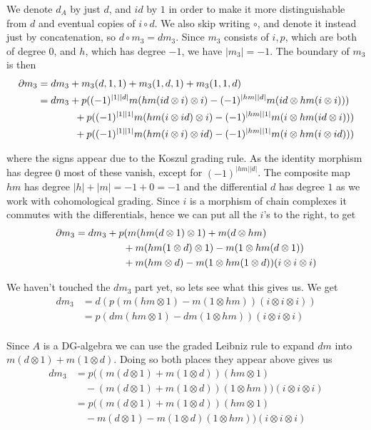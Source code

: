We denote $d_A$ by just $d$, and $id$ by $1$ in order to make it more distinguishable from $d$ and eventual copies of $i\circ d$. We also skip writing $\circ$, and denote it instead just by concatenation, so $d\circ m_3 = dm_3$. Since $m_3$ consists of $i, p$, which are both of degree $0$, and $h$, which has degree $-1$, we have $|m_3|=-1$. The boundary of $m_3$ is then
\begin{align*}
    \partial m_3 
    &= dm_3+m_3(d,1,1)+m_3(1,d,1)+m_3(1,1,d)\\
    &= dm_3
    +p((-1)^{|1||d|}m(hm(id\otimes i)\otimes i)
    -(-1)^{|hm||d|}m(id\otimes hm(i\otimes i))) \\
    & \hspace{13mm} 
    +p((-1)^{|1||1|}m(hm(i\otimes id)\otimes i)
    -(-1)^{|hm||1|}m(i\otimes hm(id\otimes i))) \\
    & \hspace{13mm} 
    +p((-1)^{|1||1|}m(hm(i\otimes i)\otimes id)
    -(-1)^{|hm||1|}m(i\otimes hm(i\otimes id)))
\end{align*}

where the signs appear due to the Koszul grading rule. As the identity morphism has degree $0$ most of these vanish, except for $(-1)^{|hm||d|}$. The composite map $hm$ has degree $|h|+|m| = -1+0 = -1$ and the differential $d$ has degree $1$ as we work with cohomological grading. Since $i$ is a morphism of chain complexes it commutes with the differentials, hence we can put all the $i$'s to the right, to get 
\begin{align*}
    \partial m_3 
    &= dm_3
    +p(m(hm(d\otimes 1)\otimes 1)
    +m(d\otimes hm) \\
    & \hspace{17mm} 
    +m(hm(1\otimes d)\otimes 1)
    -m(1\otimes hm(d\otimes 1)) \\
    & \hspace{17mm} 
    +m(hm\otimes d)
    -m(1\otimes hm(1\otimes d))(i\otimes i\otimes i)
\end{align*}

We haven't touched the $dm_3$ part yet, so lets see what this gives us. We get 
\begin{align*}
    dm_3 
    &= 
    d(p(m(hm\otimes 1)
    -m(1\otimes hm))(i\otimes i\otimes i)) \\
    &= 
    p(dm(hm\otimes 1)
    -dm(1\otimes hm))(i\otimes i\otimes i) \\
\end{align*}

Since $A$ is a DG-algebra we can use the graded Leibniz rule to expand $dm$ into $m(d\otimes 1)+m(1\otimes d)$. Doing so both places they appear above gives us
\begin{align*}
    dm_3 
    &= 
    p((m(d\otimes 1)
    +m(1\otimes d))(hm\otimes 1) \\
    &\quad 
    -(m(d\otimes 1)
    +m(1\otimes d))(1\otimes hm))(i\otimes i\otimes i) \\
    &=
    p((m(d\otimes 1)
    +m(1\otimes d))(hm\otimes 1) \\
    &\quad 
    -m(d\otimes 1)
    -m(1\otimes d)(1\otimes hm))(i\otimes i\otimes i) 
\end{align*}

